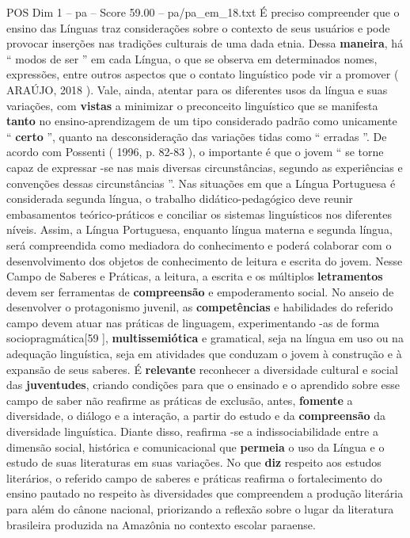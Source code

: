 \begin{textsample}{POS Dim 1 – pa – Score 59.00 – pa/pa\_em\_18.txt}
É preciso compreender que o ensino das Línguas traz considerações sobre o contexto de seus usuários e pode provocar inserções nas tradições culturais de uma dada etnia.
Dessa \textbf{maneira}, há “ modos de ser ” em cada Língua, o que se observa em determinados nomes, expressões, entre outros aspectos que o contato linguístico pode vir a promover ( ARAÚJO, 2018 ).
Vale, ainda, atentar para os diferentes usos da língua e suas variações, com \textbf{vistas} a minimizar o preconceito linguístico que se manifesta \textbf{tanto} no ensino-aprendizagem de um tipo considerado padrão como unicamente “ \textbf{certo} ”, quanto na desconsideração das variações tidas como “ erradas ”.
De acordo com Possenti ( 1996, p. 82-83 ), o importante é que o jovem “ se torne capaz de expressar -se nas mais diversas circunstâncias, segundo as experiências e convenções dessas circunstâncias ”.
Nas situações em que a Língua Portuguesa é considerada segunda língua, o trabalho didático-pedagógico deve reunir embasamentos teórico-práticos e conciliar os sistemas linguísticos nos diferentes níveis.
Assim, a Língua Portuguesa, enquanto língua materna e segunda língua, será compreendida como mediadora do conhecimento e poderá colaborar com o desenvolvimento dos objetos de conhecimento de leitura e escrita do jovem.
Nesse Campo de Saberes e Práticas, a leitura, a escrita e os múltiplos \textbf{letramentos} devem ser ferramentas de \textbf{compreensão} e empoderamento social.
No anseio de desenvolver o protagonismo juvenil, as \textbf{competências} e habilidades do referido campo devem atuar nas práticas de linguagem, experimentando -as de forma sociopragmática[59 ], \textbf{multissemiótica} e gramatical, seja na língua em uso ou na adequação linguística, seja em atividades que conduzam o jovem à construção e à expansão de seus saberes.
É \textbf{relevante} reconhecer a diversidade cultural e social das \textbf{juventudes}, criando condições para que o ensinado e o aprendido sobre esse campo de saber não reafirme as práticas de exclusão, antes, \textbf{fomente} a diversidade, o diálogo e a interação, a partir do estudo e da \textbf{compreensão} da diversidade linguística.
Diante disso, reafirma -se a indissociabilidade entre a dimensão social, histórica e comunicacional que \textbf{permeia} o uso da Língua e o estudo de suas literaturas em suas variações.
No que \textbf{diz} respeito aos estudos literários, o referido campo de saberes e práticas reafirma o fortalecimento do ensino pautado no respeito às diversidades que compreendem a produção literária para além do cânone nacional, priorizando a reflexão sobre o lugar da literatura brasileira produzida na Amazônia no contexto escolar paraense.

\end{textsample}
